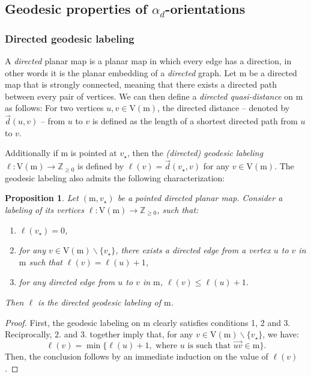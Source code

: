 \documentclass[11pt,reqno,tbtags]{amsart}
\providecommand{\Z}{}
\renewcommand{\Z}{\mathbb{Z}}
\renewcommand{\rm}{\mathrm{m}}
\newtheorem{prop}[theo]{Proposition}
\numberwithin{equation}{section}
\numberwithin{theo}{section}
\theoremstyle{definition}
\begin{document}
\subsection{Geodesic properties of \texorpdfstring{$\alpha_d$}{alpha-d}-orientations}
		
\subsubsection{Directed geodesic labeling}\label{sub:directed_geodesic_labeling}
A \emph{directed} planar map is a planar map in which every edge has a direction, in other words it is the planar embedding of a \emph{directed} graph. Let $\rm$ be a directed map that is strongly connected, meaning that there exists a directed path between every pair of vertices. We can then define a \emph{directed quasi-distance} on $\rm$ as follows: For two vertices $u,v\in \mathrm{V}(\rm)$, the directed distance -- denoted by $\vec{d}(u,v)$ --  from $u$ to $v$ is defined as the length of a shortest directed path from $u$ to $v$. 

Additionally if $\rm$ is pointed at $v_\star$, then the \emph{(directed) geodesic labeling} $\ell : \mathrm{V}(\rm) \rightarrow \mathbb{Z}_{\geq 0}$ is defined by $\ell(v)=\vec{d}(v_\star,v)$ for any $v\in \mathrm{V}(\rm)$. The geodesic labeling also admits the following characterization: 
\begin{prop}\label{prop: Characterization geodesic labeling}
Let $(\rm,v_\star)$ be a pointed directed planar map. Consider a labeling of its vertices ${\ell:\mathrm{V}(\rm)\rightarrow\Z_{\geq 0}}$, such that:
\begin{enumerate}[1.]
	\item $\ell(v_\star)=0$,
	\item for any $v\in \mathrm{V}(\rm)\backslash\{v_\star\}$, there exists a directed edge from a vertex $u$ to $v$ in $\rm$ such that ${\ell(v)=\ell(u)+1}$,
	\item for any directed edge from $u$ to $v$ in $\rm$, $\ell(v) \leq \ell(u) +1$.
\end{enumerate}
Then $\ell$ is the directed geodesic labeling of $\rm$.
\end{prop}
\begin{proof}
	First, the geodesic labeling on $\rm$ clearly satisfies conditions 1, 2 and 3. Reciprocally, $2.$ and $3.$ together imply that, for any $v\in \mathrm{V}(\rm)\backslash \{v_\star\}$, we have:
	\[
		\ell(v) = \min \{\ell(u)+1, \text{ where }u\text{ is such that }\overrightarrow{uv} \in \rm\}.
	\]
	Then, the conclusion follows by an immediate induction on the value of $\ell(v)$.
\end{proof}	
\end{document}
